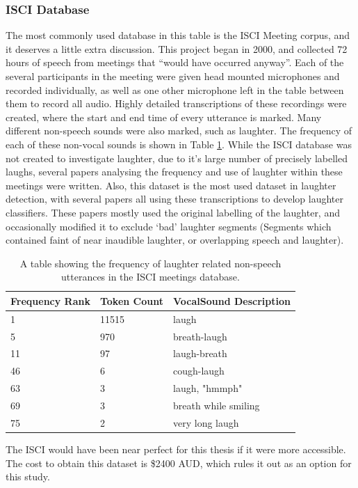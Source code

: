 \documentclass[a4paper,11pt,notitlepage]{article}
\begin{document}
\subsubsection{ISCI Database}
The most commonly used database in this table is the ISCI Meeting corpus, and it deserves a little extra discussion. This project began in 2000, and collected 72 hours of speech from meetings that ``would have occurred anyway''\cite{janin2003icsi}. Each of the several participants in the meeting were given head mounted microphones and recorded individually, as well as one other microphone left in the table between them to record all audio. Highly detailed transcriptions of these recordings were created, where the start and end time of every utterance is marked. Many different non-speech sounds were also marked, such as laughter. The frequency of each of these non-vocal sounds is shown in Table \ref{table:isci_meeting_utterance_frequency}\cite{laskowski2007correlation}. While the ISCI database was not created to investigate laughter, due to it's large number of precisely labelled laughs, several papers analysing the frequency and use of laughter within these meetings were written. Also, this dataset is the most used dataset in laughter detection, with several papers all using these transcriptions to develop laughter classifiers.\cite{kennedy2004laughter,truong2005automatic,knox2007automatic} These papers mostly used the original labelling of the laughter, and occasionally modified it to exclude `bad' laughter segments (Segments which contained faint of near inaudible laughter, or overlapping speech and laughter)\cite{truong2005automatic}.
\begin{table}[H]
\centering
\begin{tabular}{|l|l|l|}
\hline
\textbf{Frequency Rank} & \textbf{Token Count} & \textbf{VocalSound Description} \\ \hline \hline
1                       & 11515                & laugh                           \\ \hline
5                       & 970                  & breath-laugh                    \\ \hline
11                      & 97                   & laugh-breath                    \\ \hline
46                      & 6                    & cough-laugh                     \\ \hline
63                      & 3                    & laugh, "hmmph"                  \\ \hline
69                      & 3                    & breath while smiling            \\ \hline
75                      & 2                    & very long laugh                 \\ \hline
\end{tabular}
\caption{A table showing the frequency of laughter related non-speech utterances in the ISCI meetings database\cite{laskowski2007correlation}.}
\label{table:isci_meeting_utterance_frequency}
\end{table}
The ISCI would have been near perfect for this thesis if it were more accessible. The cost to obtain this dataset is \$2400 AUD, which rules it out as an option for this study.
\end{document}

